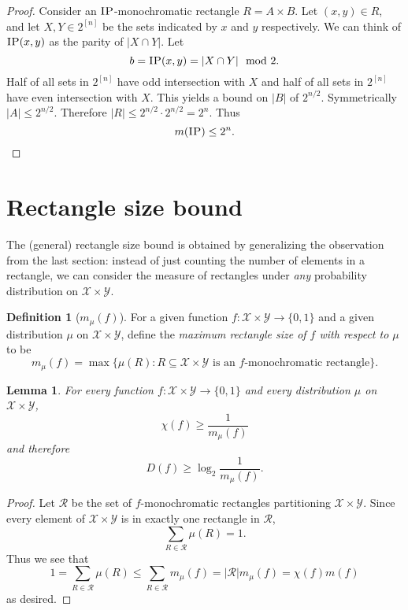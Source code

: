\documentclass[11pt]{amsart}
\theoremstyle{plain}
\newtheorem{lemma}{Lemma}
\theoremstyle{definition}
\newtheorem{definition}{Definition}
\theoremstyle{plain}
\newcommand{\calX}{\mathcal{X}}
\newcommand{\calY}{\mathcal{Y}}
\newcommand{\IP}{\textsc{IP}}
\begin{document}
\begin{proof}
Consider an $\IP$-monochromatic rectangle $R = A\times B$. Let $(x,y) \in R$, and let $X, Y \in 2^{[n]}$ be the sets indicated by $x$ and $y$ respectively. We can think of $\IP(x,y)$ as the parity of $|X\cap Y|$. Let $$b = \IP(x,y) = |X\cap Y| \mod 2.$$ Half of all sets in $2^{[n]}$ have odd intersection with $X$ and half of all sets in $2^{[n]}$ have even intersection with $X$. This yields a bound on $|B|$ of $2^{n/2}$. Symmetrically $|A| \leq 2^{n/2}$. Therefore
$|R| \leq 2^{n/2}\cdot 2^{n/2} = 2^n$. Thus
$$m(\IP) \leq 2^n.$$
\end{proof}


\newpage \section{Rectangle size bound}

The (general) rectangle size bound is obtained by generalizing the observation from the last section: instead of just counting the number of elements in a rectangle, we can consider the measure of rectangles under \emph{any} probability distribution on $\calX \times \calY$.

\begin{definition}[$m_\mu(f)$]
For a given function $f : \calX \times \calY \to \{0,1\}$ and a given distribution $\mu$ on $\calX \times \calY$, define the \emph{maximum rectangle size of $f$ with respect to $\mu$} to be
\[
m_\mu(f) = \max \{ \mu(R) : R \subseteq \calX \times \calY \mbox{ is an $f$-monochromatic rectangle} \}.
\]
\end{definition}


\begin{lemma}
For every function $f : \calX \times \calY \to \{0,1\}$ and every distribution $\mu$ on $\calX \times \calY$, 
\[
\chi(f) \ge \frac1{m_\mu(f)}
\]
and therefore
\[
D(f) \ge \log_2 \frac{1}{m_\mu(f)}.
\]
\end{lemma}

\begin{proof}
Let $\mathcal{R}$ be the set of $f$-monochromatic rectangles partitioning $\mathcal{X}\times \mathcal{Y}$. Since every element of $\mathcal{X}\times\mathcal{Y}$ is in exactly one rectangle in $\mathcal{R}$,
$$\sum_{R \in \mathcal{R}} \mu(R) = 1.$$
Thus we see that
$$1 = \sum_{R \in \mathcal{R}} \mu(R) \le \sum_{R \in \mathcal{R}} m_\mu(f) = |\mathcal{R}|m_\mu(f) = \chi(f)m(f)$$
as desired.
\end{proof}
\end{document}
